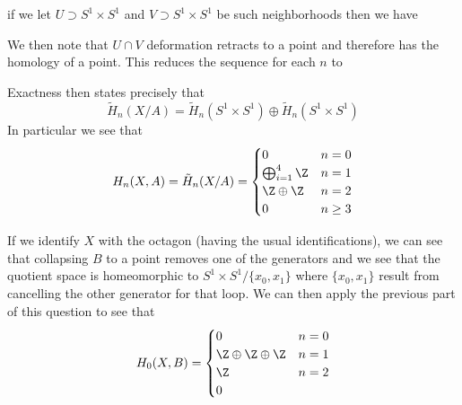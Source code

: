 \documentclass{article}
\begin{document}
\begin{solution}{\parindent}
\begin{enumerate}[(a)]
    if we let $U \supset S^1\times S^1$ and $V \supset S^1\times S^1$
    be such neighborhoods then we have
    \begin{center}
    \end{center}
    We then note that $U \cap V$ deformation retracts to a point and
    therefore has the homology of a point. This reduces the sequence
    for each $n$ to
    \begin{center}
    \end{center}
    Exactness then states precisely that 
    \[
    \tilde{H}_n(X/A) = \tilde{H}_n(S^1\times S^1) \oplus
    \tilde{H}_n(S^1\times S^1)
    \]
    In particular we see that
    \[
    H_n(X,A) = \tilde{H}_n(X/A) =
    \begin{cases}
      0 & n = 0 \\
      \bigoplus_{i=1}^4 \Z & n=1 \\
      \Z \oplus \Z & n=2 \\
      0 & n \geq 3
    \end{cases}
    \]

    If we identify $X$ with the octagon (having the usual
    identifications), we can see that collapsing $B$ to a point
    removes one of the generators and we see that the quotient space
    is homeomorphic to $S^1 \times S^1/\{x_0,x_1\}$ where
    $\{x_0,x_1\}$ result from cancelling the other generator for that
    loop. We can then apply the previous part of this question to see that
    \[
    H_0(X,B) =
    \begin{cases}
      0 & n = 0 \\
      \Z \oplus \Z \oplus \Z & n =1 \\
      \Z & n=2 \\
      0 &
    \end{cases}
    \]
  \end{enumerate}
\end{solution}
\end{document}

